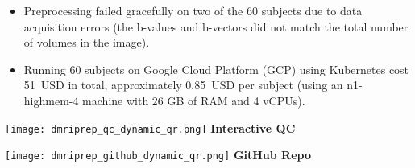 \documentclass[a0paper,portrait,fontscale=0.395]{baposter}
\begin{document}
\begin{poster}
{\begin{minipage}[c]{0.6\linewidth}
\begin{itemize}[noitemsep]
    \item Preprocessing failed gracefully on two of the 60 subjects due to data acquisition errors (the b-values and b-vectors did not match the total number of volumes in the image).
    \item Running 60 subjects on Google Cloud Platform (GCP) using Kubernetes cost 51~USD in total, approximately 0.85~USD per subject (using an n1-highmem-4 machine with 26 GB of RAM and 4 vCPUs).
\end{itemize}
\end{minipage}
\begin{minipage}[c]{0.4\linewidth}
    \centering
    \null\hfill
    \begin{minipage}[t]{0.285\linewidth}
    \centering
    \texttt{[image: dmriprep\_qc\_dynamic\_qr.png]}
    \textbf{Interactive QC}
    \end{minipage}
    \hfill
    \begin{minipage}[t]{0.285\linewidth}
    \centering
    \texttt{[image: dmriprep\_github\_dynamic\_qr.png]}
    \textbf{GitHub Repo}
    \end{minipage}
    \hfill\null
\end{minipage}
}






\end{poster}
\end{document}
